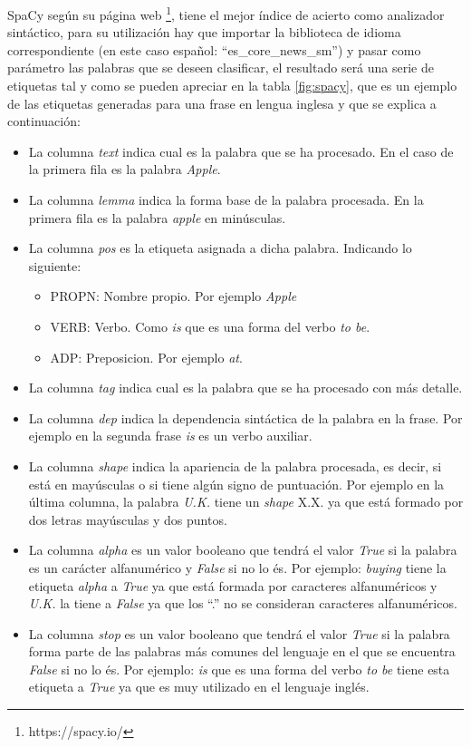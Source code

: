 
SpaCy según su página web \footnote{https://spacy.io/}, tiene el mejor índice de acierto como analizador sintáctico, para su utilización hay que importar la biblioteca de idioma correspondiente (en este caso español: ``es\_core\_news\_sm'') y pasar como parámetro las palabras que se deseen clasificar, el resultado será una serie de etiquetas tal y como se pueden apreciar en la tabla \ref{fig:spacy}, que es un ejemplo de las etiquetas generadas para una frase en lengua inglesa y que se explica a continuación:
\begin{itemize}
	\item La columna \textit{text} indica cual es la palabra que se ha procesado. En el caso de la primera fila es la palabra \textit{Apple}.
	\item La columna \textit{lemma} indica la forma base de la palabra procesada. En la primera fila es la palabra \textit{apple} en minúsculas.
	\item La columna \textit{pos} es la etiqueta asignada a dicha palabra. Indicando lo siguiente:
		\begin{itemize}
			\item PROPN: Nombre propio. Por ejemplo \textit{Apple}
			\item VERB: Verbo. Como \textit{is} que es una forma del verbo \textit{to be}.
			\item ADP: Preposicion. Por ejemplo \textit{at}.
		\end{itemize}
	
	\item La columna \textit{tag} indica cual es la palabra que se ha procesado con más detalle.
	\item La columna \textit{dep} indica la dependencia sintáctica de la palabra en la frase. Por ejemplo en la segunda frase \textit{is} es un verbo auxiliar.
	\item La columna \textit{shape} indica la apariencia de la palabra procesada, es decir, si está en mayúsculas o si tiene algún signo de puntuación. Por ejemplo en la última columna, la palabra \textit{U.K.} tiene un \textit{shape} X.X. ya que está formado por dos letras mayúsculas y dos puntos.
	\item La columna \textit{alpha} es un valor booleano que tendrá el valor \textit{True} si la palabra es un carácter alfanumérico y \textit{False} si no lo és. Por ejemplo: \textit{buying} tiene la etiqueta \textit{alpha} a \textit{True} ya que está formada por caracteres alfanuméricos y \textit{U.K.} la tiene a \textit{False} ya que los ``.'' no se consideran caracteres alfanuméricos.
	\item La columna \textit{stop} es un valor booleano que tendrá el valor \textit{True} si la palabra forma parte de las palabras más comunes del lenguaje en el que se encuentra \textit{False} si no lo és. Por ejemplo: \textit{is} que es una forma del verbo \textit{to be} tiene esta etiqueta a \textit{True} ya que es muy utilizado en el lenguaje inglés.
\end{itemize}



